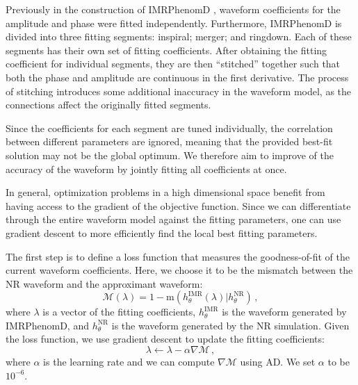\documentclass[twocolumn]{aastex631}
\begin{document}
Previously in the construction of IMRPhenomD \citep{Khan:2015jqa}, waveform
coefficients for the amplitude and phase were fitted independently.
Furthermore, IMRPhenomD is divided into three fitting segments: inspiral; merger; and ringdown.
Each of these segments has their own set of fitting coefficients.
After obtaining the fitting coefficient for individual segments, they are then ``stitched'' together such that both the phase and amplitude are continuous in the first derivative.
The process of stitching introduces some additional inaccuracy in the waveform model, as the connections affect the originally fitted segments.

Since the coefficients for each segment are tuned individually, the correlation between different parameters are ignored, meaning that the provided best-fit solution may not be the global optimum. 
We therefore aim to improve of the accuracy of the waveform by jointly fitting all coefficients at once.

In general, optimization problems in a high dimensional space benefit from having access to the gradient of the objective function. 
Since we can differentiate through the entire waveform model against the fitting parameters, one can use gradient descent to more efficiently find the local best fitting parameters.

The first step is to define a loss function that measures the goodness-of-fit of the current waveform coefficients.
Here, we choose it to be the mismatch between the NR waveform and the approximant waveform:
\begin{equation}
    \label{eq:mismatch}
	\mathcal{M}(\lambda)=1-\mathrm{m}(h_{\theta}^{\mathrm{IMR}}(\lambda)|h_{\theta}^{\mathrm{NR}})\,,
\end{equation}
where $\lambda$ is a vector of the fitting coefficients, $h_{\theta}^{\mathrm{IMR}}$ is
the waveform generated by IMRPhenomD, and $h_{\theta}^{\mathrm{NR}}$ is the waveform
generated by the NR simulation. 
Given the loss function, we use gradient descent to update the fitting coefficients:
\begin{equation}
	\lambda\leftarrow\lambda-\alpha\nabla\mathcal{M}\,, 
\end{equation}
where $\alpha$ is the learning rate and we can compute $\nabla\mathcal{M}$ using AD. We set $\alpha$ to be $10^{-6}$. 
\end{document}

